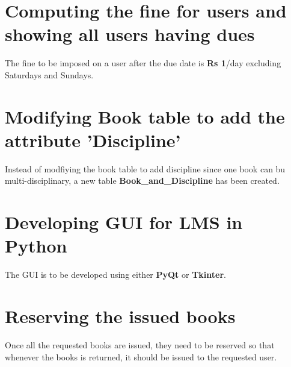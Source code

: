 \documentclass{article}
\begin{document}
\section{Computing the fine for users and showing all users having dues}
The fine to be imposed on a user after the due date is \textbf{Rs 1}/day excluding Saturdays and Sundays. 

\section{Modifying Book table to add the attribute 'Discipline'}
Instead of modfiying the book table to add discipline since one book can bu multi-disciplinary, a new table \textbf{\color{green}Book\_and\_Discipline} has been created. 

\section{Developing GUI for LMS in Python}
The GUI is to be developed using either \textbf{PyQt} or \textbf{Tkinter}.

\section{Reserving the issued books}
Once all the requested books are issued, they need to be reserved so that whenever the books is returned, it should be issued to the requested user. 
\end{document}
